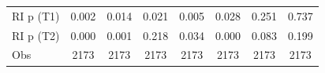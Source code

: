 {\begin{tabular}{l*{7}{c}}
RI p (T1)           &       0.002         &       0.014         &       0.021         &       0.005         &       0.028         &       0.251         &       0.737         \\
RI p (T2)           &       0.000         &       0.001         &       0.218         &       0.034         &       0.000         &       0.083         &       0.199         \\
Obs                 &        2173         &        2173         &        2173         &        2173         &        2173         &        2173         &        2173         \\
\bottomrule
\end{tabular}
}
